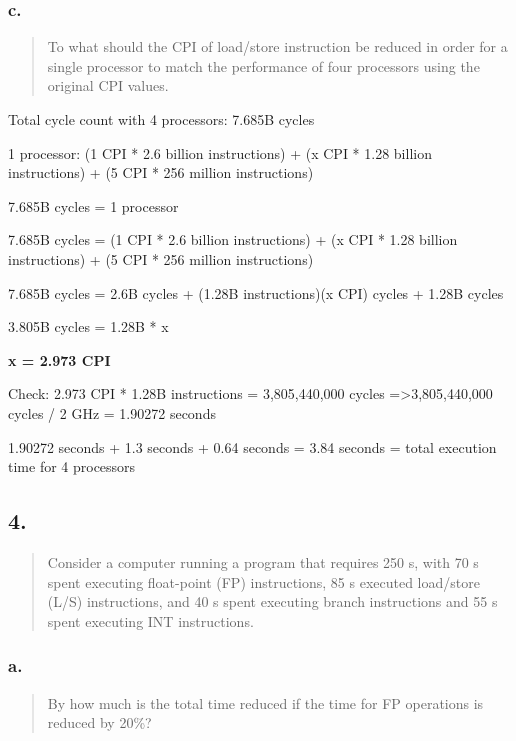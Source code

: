 \documentclass[]{article}
\begin{document}
\subsubsection{c.}\label{header-n5052}

\begin{quote}
To what should the CPI of load/store instruction be reduced in order for
a single processor to match the performance of four processors using the
original CPI values.
\end{quote}

Total cycle count with 4 processors: 7.685B cycles

1 processor: (1 CPI * 2.6 billion instructions) + (x CPI * 1.28 billion
instructions) + (5 CPI * 256 million instructions)

7.685B cycles = 1 processor

7.685B cycles = (1 CPI * 2.6 billion instructions) + (x CPI * 1.28
billion instructions) + (5 CPI * 256 million instructions)

7.685B cycles = 2.6B cycles + (1.28B instructions)(x CPI) cycles + 1.28B
cycles

3.805B cycles = 1.28B * x

\textbf{x = 2.973 CPI}

Check: 2.973 CPI * 1.28B instructions = 3,805,440,000 cycles
=\textgreater{}3,805,440,000 cycles / 2 GHz = 1.90272 seconds

1.90272 seconds + 1.3 seconds + 0.64 seconds = 3.84 seconds = total
execution time for 4 processors

\subsection{4.}\label{header-n5074}

\begin{quote}
Consider a computer running a program that requires 250 s, with 70 s
spent executing float-point (FP) instructions, 85 s executed load/store
(L/S) instructions, and 40 s spent executing branch instructions and 55
s spent executing INT instructions.
\end{quote}

\subsubsection{a.}\label{header-n5078}

\begin{quote}
By how much is the total time reduced if the time for FP operations is
reduced by 20\%?
\end{quote}
\end{document}

